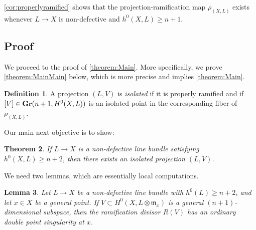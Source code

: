 \documentclass[11pt,reqno]{amsart}
\theoremstyle{plain}
\newtheorem{theorem}{Theorem}[section]
\newtheorem{lemma}[theorem]{Lemma}
\theoremstyle{definition}
\newtheorem{definition}[theorem]{Definition}
\theoremstyle{remark}
\numberwithin{equation}{section}
\renewcommand{\to}{{\longrightarrow}}
\numberwithin{equation}{section}
\begin{document}
\autoref{cor:properlyramified} shows that the projection-ramification map $\rho_{(X,L)}$ exists whenever $L \to X$ is non-defective and $h^{0}(X,L) \geq n+1$. 


\subsection{Proof}
We proceed to the proof of \autoref{theorem:Main}. More specifically, we prove \autoref{theorem:MainMain} below, which is more precise and implies \autoref{theorem:Main}.



\begin{definition}
   A projection $(L,V)$ is {\sl isolated} if it is properly ramified and if $[V] \in {\bf Gr}(n+1,H^{0}(X,L))$ is an isolated point in the corresponding fiber of $\rho_{(X,L)}$.
\end{definition}

Our main next objective is to show: 

\begin{theorem}
  \label{theorem:MainMain}
  If $L \to X$ is a non-defective line bundle satisfying $h^{0}(X,L) \geq n+2$, then there exists an isolated projection $(L,V)$.
\end{theorem}

We need two lemmas, which are essentially local computations.

\begin{lemma}\label{lemma:tangentconeRam}
  Let $L \to X$ be a non-defective line bundle with $h^{0}(L) \geq n+2$, and let $x \in X$ be a general point.  If $V \subset H^{0}(X,  L \otimes {\mathfrak m}_{x})$ is a general $(n+1)$-dimensional subspace, then the ramification divisor $R(V)$ has an ordinary double point singularity at $x$. 
\end{lemma}
\end{document}
